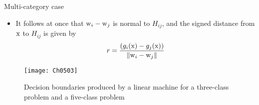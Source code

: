 \begin{frame}{Multi-category case}
\begin{itemize}
\item It follows at once that ${\rm w}_i-{\rm w}_j$ is normal to $H_{ij}$, and the signed distance from ${\rm x}$ to $H_{ij}$ is given by 
\begin{equation}
r = \frac{{({g_i}({\rm x}) - {g_j}({\rm x}))}}{{\left\| {{{\rm w}_i} - {{\rm w}_j}} \right\|}} \nonumber
\end{equation}
\end{itemize}
\begin{figure}
\texttt{[image: Ch0503]}
\caption{Decision boundaries produced by a linear machine for a three-class problem and a five-class problem}
\end{figure}
\end{frame}





